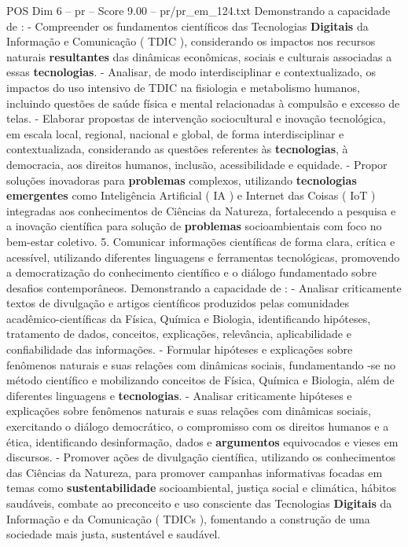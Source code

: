 \begin{textsample}{POS Dim 6 – pr – Score 9.00 – pr/pr\_em\_124.txt}
Demonstrando a capacidade de : - Compreender os fundamentos científicos das Tecnologias \textbf{Digitais} da Informação e Comunicação ( TDIC ), considerando os impactos nos recursos naturais \textbf{resultantes} das dinâmicas econômicas, sociais e culturais associadas a essas \textbf{tecnologias}. - Analisar, de modo interdisciplinar e contextualizado, os impactos do uso intensivo de TDIC na fisiologia e metabolismo humanos, incluindo questões de saúde física e mental relacionadas à compulsão e excesso de telas. - Elaborar propostas de intervenção sociocultural e inovação tecnológica, em escala local, regional, nacional e global, de forma interdisciplinar e contextualizada, considerando as questões referentes às \textbf{tecnologias}, à democracia, aos direitos humanos, inclusão, acessibilidade e equidade. - Propor soluções inovadoras para \textbf{problemas} complexos, utilizando \textbf{tecnologias} \textbf{emergentes} como Inteligência Artificial ( IA ) e Internet das Coisas ( IoT ) integradas aos conhecimentos de Ciências da Natureza, fortalecendo a pesquisa e a inovação científica para solução de \textbf{problemas} socioambientais com foco no bem-estar coletivo. 5.
Comunicar informações científicas de forma clara, crítica e acessível, utilizando diferentes linguagens e ferramentas tecnológicas, promovendo a democratização do conhecimento científico e o diálogo fundamentado sobre desafios contemporâneos.
Demonstrando a capacidade de : - Analisar criticamente textos de divulgação e artigos científicos produzidos pelas comunidades acadêmico-científicas da Física, Química e Biologia, identificando hipóteses, tratamento de dados, conceitos, explicações, relevância, aplicabilidade e confiabilidade das informações. - Formular hipóteses e explicações sobre fenômenos naturais e suas relações com dinâmicas sociais, fundamentando -se no método científico e mobilizando conceitos de Física, Química e Biologia, além de diferentes linguagens e \textbf{tecnologias}. - Analisar criticamente hipóteses e explicações sobre fenômenos naturais e suas relações com dinâmicas sociais, exercitando o diálogo democrático, o compromisso com os direitos humanos e a ética, identificando desinformação, dados e \textbf{argumentos} equivocados e vieses em discursos. - Promover ações de divulgação científica, utilizando os conhecimentos das Ciências da Natureza, para promover campanhas informativas focadas em temas como \textbf{sustentabilidade} socioambiental, justiça social e climática, hábitos saudáveis, combate ao preconceito e uso consciente das Tecnologias \textbf{Digitais} da Informação e da Comunicação ( TDICs ), fomentando a construção de uma sociedade mais justa, sustentável e saudável.

\end{textsample}
